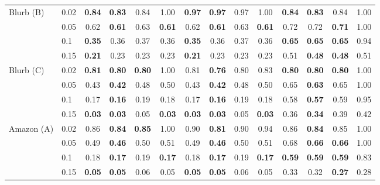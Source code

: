 \begin{tabular}{llcccccccccccc}
\midrule
Blurb (B) & 0.02 & \textbf{0.84} & \textbf{0.83} & 0.84 & 1.00 & \textbf{0.97} & \textbf{0.97} & 0.97 & 1.00 & \textbf{0.84} & \textbf{0.83} & 0.84 & 1.00 \\
 & 0.05 & 0.62 & \textbf{0.61} & 0.63 & \textbf{0.61} & 0.62 & \textbf{0.61} & 0.63 & \textbf{0.61} & 0.72 & 0.72 & \textbf{0.71} & 1.00 \\
 & 0.1 & \textbf{0.35} & 0.36 & 0.37 & 0.36 & \textbf{0.35} & 0.36 & 0.37 & 0.36 & \textbf{0.65} & \textbf{0.65} & \textbf{0.65} & 0.94 \\
 & 0.15 & \textbf{0.21} & 0.23 & 0.23 & 0.23 & \textbf{0.21} & 0.23 & 0.23 & 0.23 & 0.51 & \textbf{0.48} & \textbf{0.48} & 0.51 \\
\midrule
Blurb (C) & 0.02 & \textbf{0.81} & \textbf{0.80} & \textbf{0.80} & 1.00 & 0.81 & \textbf{0.76} & 0.80 & 0.83 & \textbf{0.80} & \textbf{0.80} & \textbf{0.80} & 1.00 \\
 & 0.05 & 0.43 & \textbf{0.42} & 0.48 & 0.50 & 0.43 & \textbf{0.42} & 0.48 & 0.50 & 0.65 & \textbf{0.63} & 0.65 & 1.00 \\
 & 0.1 & 0.17 & \textbf{0.16} & 0.19 & 0.18 & 0.17 & \textbf{0.16} & 0.19 & 0.18 & 0.58 & \textbf{0.57} & 0.59 & 0.95 \\
 & 0.15 & \textbf{0.03} & \textbf{0.03} & 0.05 & \textbf{0.03} & \textbf{0.03} & \textbf{0.03} & 0.05 & \textbf{0.03} & 0.36 & \textbf{0.34} & 0.39 & 0.42 \\
\midrule
Amazon (A) & 0.02 & 0.86 & \textbf{0.84} & \textbf{0.85} & 1.00 & 0.90 & \textbf{0.81} & 0.90 & 0.94 & 0.86 & \textbf{0.84} & 0.85 & 1.00 \\
 & 0.05 & 0.49 & \textbf{0.46} & 0.50 & 0.51 & 0.49 & \textbf{0.46} & 0.50 & 0.51 & 0.68 & \textbf{0.66} & \textbf{0.66} & 1.00 \\
 & 0.1 & 0.18 & \textbf{0.17} & 0.19 & \textbf{0.17} & 0.18 & \textbf{0.17} & 0.19 & \textbf{0.17} & \textbf{0.59} & \textbf{0.59} & \textbf{0.59} & 0.83 \\
 & 0.15 & \textbf{0.05} & \textbf{0.05} & 0.06 & 0.05 & \textbf{0.05} & \textbf{0.05} & 0.06 & 0.05 & 0.33 & 0.32 & \textbf{0.27} & 0.28 \\
\bottomrule
\end{tabular}
